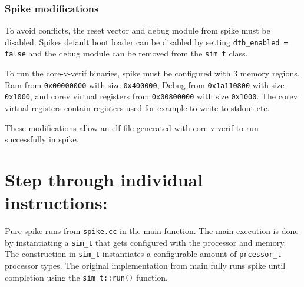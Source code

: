 \subsubsection{Spike modifications}

To avoid conflicts, the reset vector and debug module from spike must be disabled. Spikes default boot loader can be disabled by setting \lstinline{dtb_enabled = false} and the debug module can be removed from the \lstinline{sim_t} class.

To run the core-v-verif binaries, spike must be configured with 3 memory regions. Ram from \lstinline{0x00000000} with size \lstinline{0x400000}, Debug from \lstinline{0x1a110800} with size \lstinline{0x1000}, and corev virtual registers from \lstinline{0x00800000} with size \lstinline{0x1000}. The corev virtual registers contain registers used for example to write to stdout etc.

These modifications allow an elf file generated with core-v-verif to run successfully in spike.
%
%
%



\section{Step through individual instructions: }

Pure spike runs from \lstinline{spike.cc} in the main function. The main execution is done by instantiating a \lstinline{sim_t} that gets configured with the processor and memory. The construction in \lstinline{sim_t} instantiates a configurable amount of \lstinline{prcessor_t} processor types. The original implementation from main fully runs spike until completion using the \lstinline{sim_t::run()} function.

